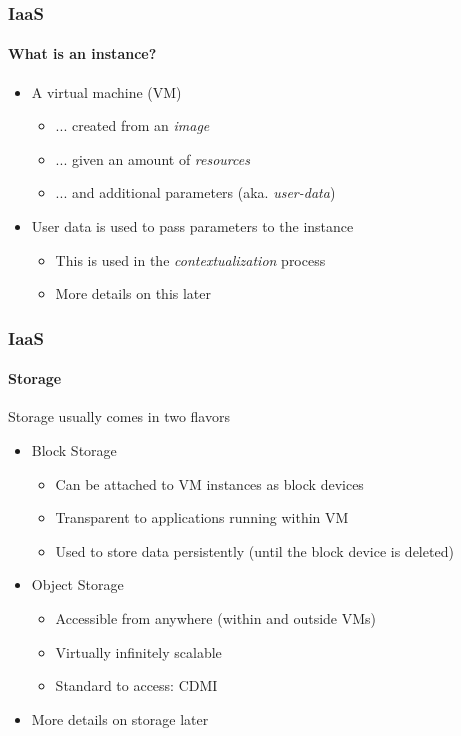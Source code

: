 \begin{frame}
\frametitle{IaaS}
\framesubtitle{What is an instance?}
\begin{itemize}
\item A virtual machine (VM)
  \begin{itemize}
  \item ... created from an \emph{image}
  \item ... given an amount of \emph{resources}
  \item ... and additional parameters (aka. \emph{user-data})
  \end{itemize}
\item User data is used to pass parameters to the instance
  \begin{itemize}
  \item This is used in the \emph{contextualization} process
  \item More details on this later
  \end{itemize}
\end{itemize}
\end{frame}

\begin{frame}
\frametitle{IaaS}
\framesubtitle{Storage}
Storage usually comes in two flavors
\begin{itemize}
\item Block Storage
  \begin{itemize}
  \item Can be attached to VM instances as block devices
  \item Transparent to applications running within VM
  \item Used to store data persistently (until the block device is deleted)
  \end{itemize}
\item Object Storage
  \begin{itemize}
  \item Accessible from anywhere (within and outside VMs)
  \item Virtually infinitely scalable
  \item Standard to access: CDMI
  \end{itemize}
\item More details on storage later
\end{itemize}
\end{frame}

